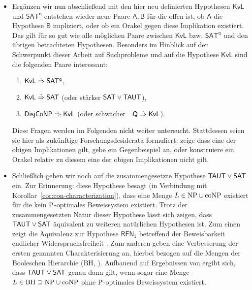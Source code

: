 \begin{itemize}[parsep=0pt,listparindent=\parindent,itemsep=5pt plus 1pt minus 1pt,midpenalty=0]
    \item Ergänzen wir nun abschließend mit den hier neu definierten Hypothesen $\mathsf{KvL}$ und $\mathsf{SAT^{q}}$ entstehen wieder neue Paare $\mathsf{A,B}$ für die offen ist, ob $\mathsf A$ die Hypothese $\mathsf B$ impliziert, oder ob ein Orakel gegen diese Implikation existiert. Das gilt für so gut wie alle möglichen Paare zwischen $\mathsf{KvL}$ bzw. $\mathsf{SAT^{q}}$ und den übrigen betrachteten Hypothesen. 
        Besonders im Hinblick auf den Schwerpunkt dieser Arbeit auf Suchprobleme und auf die Hypothese $\mathsf{KvL}$ sind die folgenden Paare interessant:
        \begin{enumerate}[noitemsep,resume,label=(\roman*)]
            \item $\mathsf{KvL}\stackrel{\smash{\text{\raisebox{-1pt}{\tiny ?}}}}{\Rightarrow}\mathsf{SAT^{q}}$,
            \item $\mathsf{KvL}\stackrel{\smash{\text{\raisebox{-1pt}{\tiny ?}}}}{\Rightarrow}\hSAT$ (oder stärker $\hSAT\lor\hTAUT$),
            \item $\hDisjCoNP\stackrel{\smash{\text{\raisebox{-1pt}{\tiny ?}}}}{\Rightarrow}\mathsf{KvL}$ (oder schwächer $\neg\hQ\stackrel{\smash{\text{\raisebox{-1pt}{\tiny ?}}}}{\Rightarrow}\mathsf{KvL}$).
        \end{enumerate}
        Diese Fragen werden im Folgenden nicht weiter untersucht. Stattdessen seien sie hier als zukünftige Forschungsdesiderata formuliert: zeige dass eine der obigen Implikationen gilt, gebe ein Gegenbeispiel an, oder konstruiere ein Orakel relativ zu diesem eine der obigen Implikationen nicht gilt.

    \item Schließlich gehen wir noch auf die zusammengesetzte Hypothese $\hTAUT\lor\hSAT$ ein. Zur Erinnerung: diese Hypothese besagt (in Verbindung mit Korollar~\ref{cor:con-characterization}), dass eine Menge $L\in\NP\cup\coNP$ existiert für die kein $\P$-optimales Beweissystem existiert.
        Trotz der zusammengesetzten Natur dieser Hypothese lässt sich zeigen, dass $\hTAUT\lor\hSAT$ äquivalent zu weiteren natürlichen Hypothesen ist.
        Zum einen zeigt \textcite[Thm.~3.2]{khaniki_new_2022} die Äquivalenz zur Hypothese $\mathsf{RFN_1}$ betreffend der Beweisbarkeit endlicher Widerspruchsfreiheit \parencites(vgl.){pudlak_incompleteness_2017}.
        Zum anderen geben \textcite{egidy_upward_2023} eine Verbesserung der ersten genannten Charakterisierung an, hierbei bezogen auf die Mengen der Booleschen Hierarchie ($\mathrm{BH}$, \cites(vgl.)(){cai_boolean_1986}{cai_boolean_1988}{cai_boolean_1989}). Aufbauend auf Ergebnissen von \textcite{kobler_optimal_2003} ergibt sich, dass $\hTAUT\lor\hSAT$ genau dann gilt, wenn sogar eine Menge $L \in \mathrm{BH}\supseteq \NP\cup\coNP$ ohne $\P$-optimales Beweissystem existiert.


\end{itemize}
